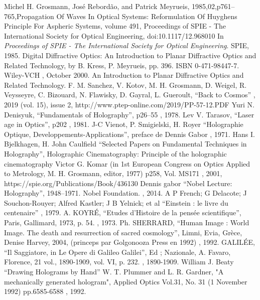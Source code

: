 \documentclass[a4paper,12pt]{article}
\begin{document}
\begin{appendix}
\begin{thebibliography}{1}
 Michel H. Grosmann, José Rebordão,  and Patrick Meyrueis, 1985,02,p761--765,Propagation Of Waves In Optical Systems: Reformulation Of Huyghens Principle For Aspheric Systems, volume 491, Proceedings of SPIE - The International Society for Optical Engineering, doi:10.1117/12.968010
\newblock In {\em Proceedings of SPIE - The International Society for Optical Engineering}. SPIE, 1985.
 Digital Diffractive Optics: An Introduction to Planar Diffractive Optics and Related Technology, by B. Kress, P. Meyrueis, pp. 396. ISBN 0-471-98447-7. Wiley-VCH , October 2000.
\newblock An Introduction to Planar Diffractive Optics and Related Technology.
 F. M. Sanchez, V. Kotov, M. H. Grosmann, D. Weigel, R. Veysseyre, C. Bizouard, N. Flawisky, D. Gayral, L. Gueroult, ``Back to Cosmos''
, 2019 (vol. 15), issue 2, http://www.ptep-online.com/2019/PP-57-12.PDF
 Yuri N. Denisyuk, ``Fundamentals of Holography'', p26--55
, 1978.
 Lev V. Tarasov, ``Laser age in Optics'', p202
, 1981.
 J-C Vienot, P. Smigielski, H. Royer ``Holographie Optique, Developpements-Applications'', preface de Dennis Gabor
, 1971.
 Hans I. Bjelkhagen, H. John Caulfield ``Selected Papers on Fundamental Techniques in Holography'', Holographic Cinematography: Principle of the holographic cinematography Victor G. Komar (in 1st European Congress on Optics Applied to Metrology, M. H. Grosmann, editor, 1977) p258, Vol. MS171
, 2001, https://spie.org/Publications/Book/436130
 Dennis gabor ``Nobel Lecture: Holography'', 1948–1971. Nobel Foundation.
, 2014.
 A P French; G Delacote; J Souchon-Rouyer; Alfred Kastler; J B Yelnick; et al ``Einstein : le livre du centenaire''
, 1979.
 A. KOYRÉ, ``Etudes d’Histoire de la pensée scientifique'', Paris, Gallimard, 1973, p. 54.
, 1973.
 Ph. SHERRARD, ``Human Image : World Image. The death and resurrection of sacred cosmology'', Limni, Evia, Grèce, Denise Harvey, 2004, (princeps par Golgonooza Press en 1992)
, 1992.
 GALILÉE, ``Il Saggiatore, in Le Opere di Galileo Galilei'', Ed ; Nazionale, A. Favaro, Florence, 21 vol., 1890-1909, vol. VI, p. 232.
, 1890-1909.
 William J. Beaty ``Drawing Holograms by Hand'' W. T. Plummer and L. R. Gardner, "A mechanically generated hologram", Applied Optics Vol.31, No. 31 (1 November 1992) pp.6585-6588
, 1992.


\end{thebibliography}
\end{appendix}
\end{document}
